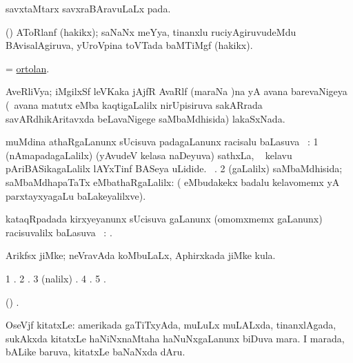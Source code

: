 \bentry
{}
\gl{\nA}
\bmng
savxtaMtarx savxraBAravuLaLx pada. 
\emng
\eentry

\bentry
{}
\gl{\nA}
\bmng
(\pArxvi) AToRlanf (hakikx); saNaNx meYya, tinanxlu ruciyAgiruvudeMdu BAvisalAgiruva, yUroVpina toVTada baMTiMgf (hakikx). 
\emng
\eentry

\bentry
{}
\gl{\nA}
\bmng
= \hyperlink{ortolan}{ortolan}. 
\emng
\eentry

\bentry
{}
\gl{\gu}
\bmng
AveRliVya; iMgilxSf leVKaka jAjfR AvaRlf (maraNa )na yA avana barevaNigeya (\kanmu\ avana  matutx  eMba kaqtigaLalilx nirUpisiruva sakARrada savARdhikAritavxda beLavaNigege saMbaMdhisida) lakaSxNada. 
\emng
\eentry

\bentry
{}
\gl{\uparx}
\bmng
muMdina athaRgaLanunx sUcisuva padagaLanunx racisalu baLasuva \uparx\ : 
\bnum
\num{1} (nAmapadagaLalilx) (yAvudeV kelasa naDeyuva) sathxLa, \udA\  kelavu pAriBASikagaLalilx lAYxTinf BASeya  uLidide. \udA\ . 
\num{2} (\gu gaLalilx) saMbaMdhisida; saMbaMdhapaTaTx eMbathaRgaLalilx:  ( eMbudakekx badalu kelavomemx  yA  parxtayxyagaLu baLakeyalilxve). 
\enum
\emng
\eentry

\bentry
{}
\gl{\uparx}
\bmng
kataqRpadada kirxyeyanunx sUcisuva \gu gaLanunx (omomxmemx \nA gaLanunx) racisuvalilx baLasuva \uparx\ : . 
\emng
\eentry

\bentry
{}
\gl{\nA}
\bmng
Arikfsx jiMke; neVravAda koMbuLaLx, Aphirxkada jiMke kula. 
\emng
\eentry

\bentry
{}
\gl{\saMkiSx}
\bmng
\bnum
\num{1} . 
\num{2} . 
\num{3} (\UK nalilx) . 
\num{4} . 
\num{5} . 
\enum
\emng
\eentry

\bentry
{}
\gl{\saMkeV}
\bmng
(\ravi) . 
\emng
\eentry

\bentry
{}
\gl{\nA}
\bmng
OseVjf kitatxLe: 
\banum
{} amerikada gaTiTxyAda, muLuLx muLALxda, tinanxlAgada, sukAkxda kitatxLe haNiNxnaMtaha haNuNxgaLanunx biDuva mara. 
 I marada, bALike baruva, kitatxLe baNaNxda dAru. 
\eanum
\emng
\eentry

